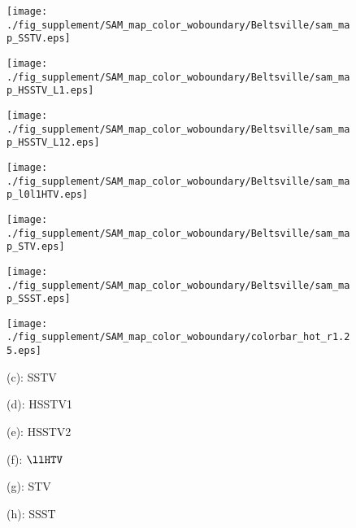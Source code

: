 \begin{figure*}[t]
\begin{center}
		\begin{minipage}{0.15\hsize}
			\centerline{\texttt{[image: ./fig\_supplement/SAM\_map\_color\_woboundary/Beltsville/sam\_map\_SSTV.eps]}} %
		\end{minipage}
		\begin{minipage}{0.15\hsize}
			\centerline{\texttt{[image: ./fig\_supplement/SAM\_map\_color\_woboundary/Beltsville/sam\_map\_HSSTV\_L1.eps]}} %
		\end{minipage}
		\begin{minipage}{0.15\hsize}
			\centerline{\texttt{[image: ./fig\_supplement/SAM\_map\_color\_woboundary/Beltsville/sam\_map\_HSSTV\_L12.eps]}} %
		\end{minipage}
		\begin{minipage}{0.15\hsize}
			\centerline{\texttt{[image: ./fig\_supplement/SAM\_map\_color\_woboundary/Beltsville/sam\_map\_l0l1HTV.eps]}} %
		\end{minipage}
		\begin{minipage}{0.15\hsize}
			\centerline{\texttt{[image: ./fig\_supplement/SAM\_map\_color\_woboundary/Beltsville/sam\_map\_STV.eps]}} %
		\end{minipage}
		\begin{minipage}{0.15\hsize}
			\centerline{\texttt{[image: ./fig\_supplement/SAM\_map\_color\_woboundary/Beltsville/sam\_map\_SSST.eps]}} %
		\end{minipage}
		\begin{minipage}{0.050\hsize}
			\centerline{\texttt{[image: ./fig\_supplement/SAM\_map\_color\_woboundary/colorbar\_hot\_r1.25.eps]}} %
		\end{minipage}
		
		\vspace{1mm}
		
		\begin{minipage}{0.15\hsize}
			\centerline{\small{(c): SSTV}}
		\end{minipage}
		\begin{minipage}{0.15\hsize}
			\centerline{\small{(d): HSSTV1}}
		\end{minipage}
		\begin{minipage}{0.15\hsize}
			\centerline{\small{(e): HSSTV2}}
		\end{minipage}
		\begin{minipage}{0.15\hsize}
			\centerline{\small{(f): $\llHTV$}}
		\end{minipage}
		\begin{minipage}{0.15\hsize}
			\centerline{\small{(g): STV}}
		\end{minipage}
		\begin{minipage}{0.15\hsize}
			\centerline{\small{(h): SSST}}
		\end{minipage}
		\begin{minipage}{0.050\hsize}
			\centerline{\hspace{\hsize}} %
		\end{minipage}
		

\end{center}
\end{figure*}
